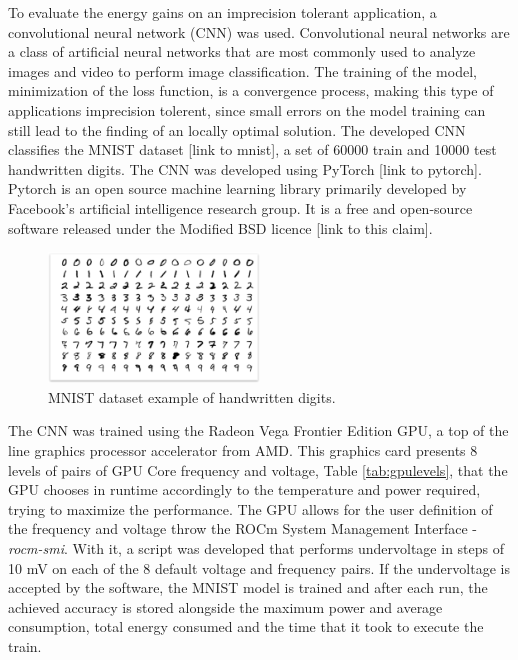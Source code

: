 To evaluate the energy gains on an imprecision tolerant application, a convolutional neural network (CNN) was used. Convolutional neural networks are a class of artificial neural networks that are most commonly used to analyze images and video to perform image classification. The training of the model, minimization of the loss function, is a convergence process, making this type of applications imprecision tolerent, since small errors on the model training can still lead to the finding of an locally optimal solution.
The developed CNN classifies the MNIST dataset [link to mnist], a set of 60000 train and 10000 test handwritten digits. The CNN was developed using PyTorch [link to pytorch]. Pytorch is an open source machine learning library primarily developed by Facebook's artificial intelligence research group. It is a free and open-source  software released under the Modified BSD licence [link to this claim]. 

\begin{figure}[!htb]
  \centering
  \includegraphics[width=0.5\textwidth]{Figures/Results/mnist.png}
  \caption[]{MNIST dataset example of handwritten digits.}
  \label{fig:mnist}
\end{figure}

The CNN was trained using the Radeon Vega Frontier Edition GPU, a top of the line graphics processor accelerator from AMD. This graphics card presents 8 levels of pairs of GPU Core frequency and voltage, Table \ref{tab:gpulevels}, that the GPU chooses in runtime accordingly to the temperature and power required, trying to maximize the performance. The GPU allows for the user definition of the frequency and voltage throw the ROCm System Management Interface - \textit{rocm-smi}. With it, a script was developed that performs undervoltage in steps of 10 mV on each of the 8 default voltage and frequency pairs. If the undervoltage is accepted by the software, the MNIST model is trained and after each run, the achieved accuracy is stored alongside the maximum power and average consumption, total energy consumed and the time that it took to execute the train.







